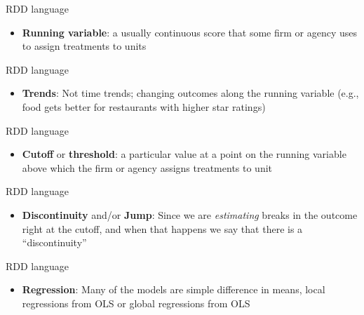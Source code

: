 \documentclass{beamer}
\begin{document}
\begin{frame}{RDD language}

\begin{itemize}
\item \textbf{Running variable}: a usually continuous score that some firm or agency uses to assign treatments to units
\end{itemize}

\end{frame}

\begin{frame}{RDD language}

\begin{itemize}
\item \textbf{Trends}: Not time trends; changing outcomes along the running variable (e.g., food gets better for restaurants with higher star ratings)
\end{itemize}

\end{frame}
\begin{frame}{RDD language}

\begin{itemize}
\item \textbf{Cutoff} or \textbf{threshold}: a particular value at a point on the running variable above which the firm or agency assigns treatments to unit
\end{itemize}

\end{frame}
\begin{frame}{RDD language}

\begin{itemize}
\item \textbf{Discontinuity} and/or \textbf{Jump}: Since we are \emph{estimating} breaks in the outcome right at the cutoff, and when that happens we say that there is a ``discontinuity''
\end{itemize}

\end{frame}
\begin{frame}{RDD language}

\begin{itemize}
\item \textbf{Regression}: Many of the models are simple difference in means, local regressions from OLS or global regressions from OLS
\end{itemize}

\end{frame}
\end{document}
